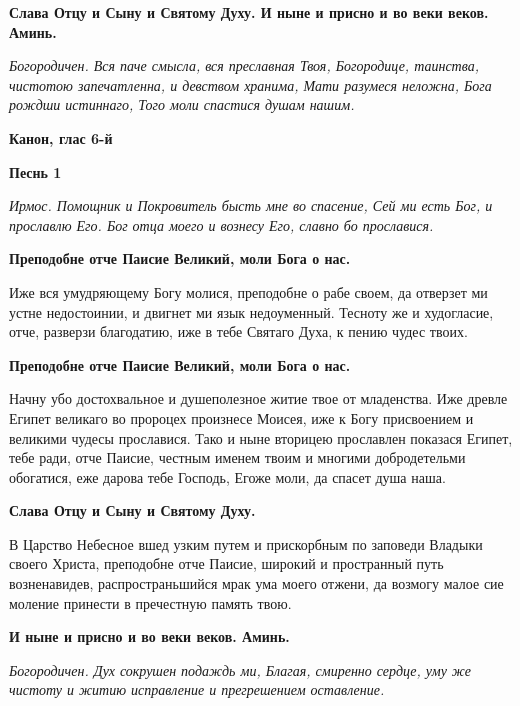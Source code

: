 \bfseries Слава Отцу и Сыну и Святому Духу. И ныне и присно и во веки веков. Аминь.\normalfont{}


\itshape Богородичен.\normalfont{} Вся паче смысла, вся преславная Твоя, Богородице, таинства, чистотою запечатленна, и девством хранима, Мати разумеся неложна, Бога рождши истиннаго, Того моли спастися душам нашим.


\bfseries Канон, глас 6-й\normalfont{}


\bfseries Песнь 1\normalfont{}


\itshape Ирмос.\normalfont{} Помощник и Покровитель бысть мне во спасение, Сей ми есть Бог, и прославлю Его. Бог отца моего и вознесу Его, славно бо прославися.




\bfseries Преподобне отче Паисие Великий, моли Бога о нас.\normalfont{}




Иже вся умудряющему Богу молися, преподобне о рабе своем, да отверзет ми устне недостоинии, и двигнет ми язык недоуменный. Тесноту же и худогласие, отче, разверзи благодатию, иже в тебе Святаго Духа, к пению чудес твоих.




\bfseries Преподобне отче Паисие Великий, моли Бога о нас.\normalfont{} 




Начну убо достохвальное и душеполезное житие твое от младенства. Иже древле Египет великаго во пророцех произнесе Моисея, иже к Богу присвоением и великими чудесы прославися. Тако и ныне вторицею прославлен показася Египет, тебе ради, отче Паисие, честным именем твоим и многими добродетельми обогатися, еже дарова тебе Господь, Егоже моли, да спасет душа наша. 




\bfseries Слава Отцу и Сыну и Святому Духу.\normalfont{} 




В Царство Небесное вшед узким путем и прискорбным по заповеди Владыки своего Христа, преподобне отче Паисие, широкий и пространный путь
возненавидев, распространьшийся мрак ума моего отжени, да возмогу малое сие моление принести в пречестную память твою. 




\bfseries И ныне и присно и во веки веков. Аминь.\normalfont{} 




\itshape Богородичен.\normalfont{} Дух сокрушен подаждь ми, Благая, смиренно сердце, уму же чистоту и житию исправление и прегрешением оставление. 





